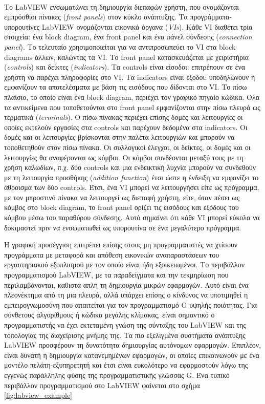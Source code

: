 \paragraph{}Το LabVIEW ενσωματώνει τη δημιουργία διεπαφών χρήστη, που ονομάζονται εμπρόσθιοι πίνακες (\emph{front panels}) στον κύκλο ανάπτυξης. Τα προγράμματα-υπορουτίνες LabVIEW ονομάζονται εικονικά όργανα (\emph{VIs}). Κάθε VI διαθέτει τρία στοιχεία: ένα block diagram, ένα front panel και ένα πάνελ σύνδεσης (\emph{connection panel}). Το τελευταίο χρησιμοποιείται για να αντιπροσωπεύει το VI στα block diagrams άλλων, καλώντας τα VI. Το front panel κατασκευάζεται με χειριστήρια (\emph{controls}) και δείκτες (\emph{indicators}). Τα controls είναι είσοδοι: επιτρέπουν σε ένα χρήστη να παρέχει πληροφορίες στο VI. Τα indicators είναι έξοδοι: υποδηλώνουν ή εμφανίζουν τα αποτελέσματα με βάση τις εισόδους που δίδονται στο VI. Το πίσω πλαίσιο, το οποίο είναι ένα block diagram, περιέχει τον γραφικό πηγαίο κώδικα. Όλα τα αντικείμενα που τοποθετούνται στο front panel εμφανίζονται στην πίσω πλευρά ως τερματικά (\emph{terminals}). Ο πίσω πίνακας περιέχει επίσης δομές και λειτουργίες οι οποίες εκτελούν εργασίες στα controls και παρέχουν δεδομένα στα indicators. Οι δομές και οι λειτουργίες βρίσκονται στην παλέτα λειτουργιών και μπορούν να τοποθετηθούν στον πίσω πίνακα. Οι συλλογικοί έλεγχοι, οι δείκτες, οι δομές και οι λειτουργίες θα αναφέρονται ως κόμβοι. Οι κόμβοι συνδέονται μεταξύ τους με τη χρήση καλωδίων, π.χ. δύο controls και μια ενδεικτική λυχνία μπορούν να συνδεθούν με τη λειτουργία προσθήκης (\emph{addition function}) έτσι ώστε η ένδειξη να εμφανίζει το άθροισμα των δύο controls. Έτσι, ένα VI μπορεί να λειτουργήσει είτε ως πρόγραμμα, με τον μπροστινό πίνακα να λειτουργεί ως διεπαφή χρήστη, είτε, όταν πέσει ως κόμβος στο block diagram, το front panel ορίζει τις εισόδους και εξόδους του κόμβου μέσω του παραθύρου σύνδεσης. Αυτό σημαίνει ότι κάθε VI μπορεί εύκολα να δοκιμαστεί πριν να ενσωματωθεί ως υπορουτίνα σε ένα μεγαλύτερο πρόγραμμα.

Η γραφική προσέγγιση επιτρέπει επίσης στους μη προγραμματιστές να χτίσουν προγράμματα με μεταφορά και απόθεση εικονικών αναπαραστάσεων του εργαστηριακού εξοπλισμού με τον οποίο είναι ήδη εξοικειωμένοι. Το περιβάλλον προγραμματισμού LabVIEW, με τα παραδείγματα και την τεκμηρίωση που περιλαμβάνονται, καθιστά απλή τη δημιουργία μικρών εφαρμογών. Αυτό είναι ένα πλεονέκτημα από τη μια πλευρά, αλλά υπάρχει επίσης ο κίνδυνος να υποτιμηθεί η εμπειρογνωμοσύνη που απαιτείται για τον προγραμματισμό G υψηλής ποιότητας. Για σύνθετους αλγορίθμους ή κώδικα μεγάλης κλίμακας, είναι σημαντικό ο προγραμματιστής να έχει εκτεταμένη γνώση της σύνταξης του LabVIEW και της τοπολογίας της διαχείρισης μνήμης της. Τα πιο εξελιγμένα συστήματα ανάπτυξης LabVIEW προσφέρουν τη δυνατότητα δημιουργίας αυτόνομων εφαρμογών. Επιπλέον, είναι δυνατή η δημιουργία κατανεμημένων εφαρμογών, οι οποίες επικοινωνούν με ένα μοντέλο πελάτη-εξυπηρετητή και έτσι είναι ευκολότερο να εφαρμοστούν λόγω της εγγενώς παράλληλης φύσης της προγραμματιστικής γλώσσας G. Ένα τυπικό περιβάλλον προγραμματισμού στο LabVIEW φαίνεται στο σχήμα \ref{fig:labview_example}

